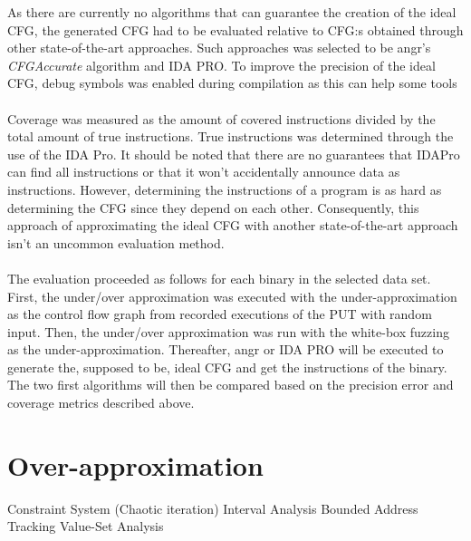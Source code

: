 \documentclass{kththesis}
\begin{document}
\noindent As there are currently no algorithms that can guarantee the creation of the ideal CFG, the generated CFG had to be evaluated relative to CFG:s obtained through other state-of-the-art approaches. Such approaches was selected to be angr's \textit{CFGAccurate} algorithm\cite{angr} and IDA PRO\cite{IDAPro}. To improve the precision of the ideal CFG, debug symbols was enabled during compilation as this can help some tools\cite{alternating}
\\ \\ 
Coverage was measured as the amount of covered instructions divided by the total amount of true instructions. True instructions was determined through the use of the IDA Pro. It should be noted that there are no guarantees that IDAPro can find all instructions or that it won't accidentally announce data as instructions. However, determining the instructions of a program is as hard as determining the CFG since they depend on each other. Consequently, this approach of approximating the ideal CFG with another state-of-the-art approach isn't an uncommon evaluation method\cite{alternating}\cite{preciseCFG}.%
\\ \\
The evaluation proceeded as follows for each binary in the selected data set. First, the under/over approximation was executed with the under-approximation as the control flow graph from recorded executions of the PUT with random input. Then, the under/over approximation was run with the white-box fuzzing as the under-approximation. Thereafter, angr or IDA PRO will be executed to generate the, supposed to be, ideal CFG and get the instructions of the binary. The two first algorithms will then be compared based on the precision error and coverage metrics described above.

\section{Over-approximation}

Constraint System (Chaotic iteration)
Interval Analysis
Bounded Address Tracking %
Value-Set Analysis
\end{document}
